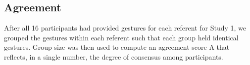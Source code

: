 \documentclass{sigchi}
\newcommand\tabhead[1]{\small\textbf{#1}}
\begin{document}

\subsection{Agreement}

After all 16 participants had provided gestures for each referent for Study 1, we grouped the gestures within each referent such that each group held identical gestures. Group size was then used to compute an agreement score A that reflects, in a single number, the degree of consensus among participants.
\end{document}
